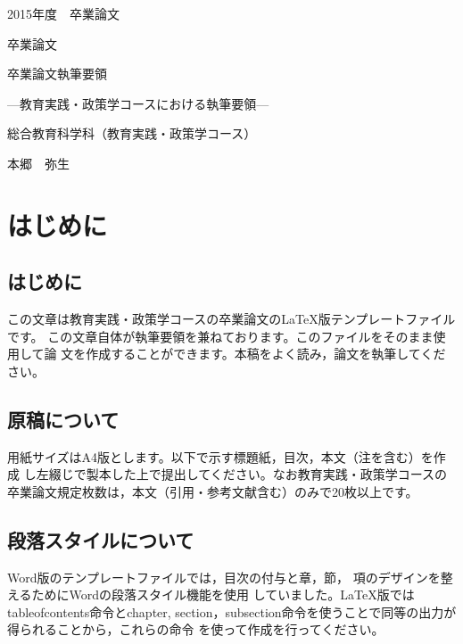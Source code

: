 \documentclass[a4paper,11pt,oneside,openany]{jsbook}
\begin{document}
\thispagestyle{empty}
2015年度　卒業論文%
\bigskip%
\LARGE%
\begin{center}
卒業論文
\end{center}
\bigskip\bigskip\bigskip\bigskip\bigskip\bigskip\bigskip %
\begin{center} %
卒業論文執筆要領
\end{center}
\Large %
\begin{center}
---教育実践・政策学コースにおける執筆要領---
\end{center}
\bigskip\bigskip\bigskip\bigskip\bigskip\bigskip\bigskip\bigskip\bigskip\bigskip
\bigskip\bigskip\bigskip\bigskip\bigskip\bigskip\bigskip\bigskip\bigskip
\Large %
\begin{center}
 総合教育科学科（教育実践・政策学コース）
\end{center}
\LARGE %
\begin{center}
本郷　弥生
\end{center}
\normalsize
\thispagestyle{empty}
\tableofcontents

\chapter{はじめに}
\section{はじめに}
この文章は教育実践・政策学コースの卒業論文の\LaTeX{}版テンプレートファイルです。
この文章自体が執筆要領を兼ねております。このファイルをそのまま使用して論
文を作成することができます。本稿をよく読み，論文を執筆してください。


\section{原稿について}
用紙サイズはA4版とします。以下で示す標題紙，目次，本文（注を含む）を作成
し左綴じで製本した上で提出してください。なお教育実践・政策学コースの卒業論文規定枚数は，本文（引用・参考文献含む）のみで20枚以上です。

\section{段落スタイルについて}
Word\textregistered{}版のテンプレートファイルでは，目次の付与と章，節，
項のデザインを整えるためにWord\textregistered{}の段落スタイル機能を使用
していました。\LaTeX{}版ではtableofcontents命令とchapter, section，subsection命令を使うことで同等の出力が得られることから，これらの命令
を使って作成を行ってください。
\end{document}
